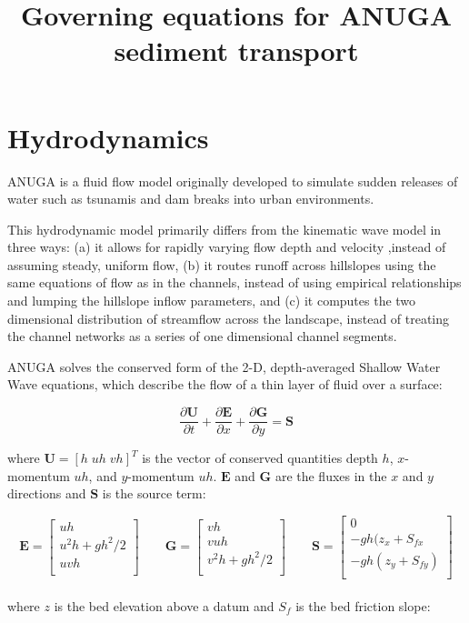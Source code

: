 \documentclass[11pt]{article}
\begin{document}
\title{Governing equations for ANUGA sediment transport}
\maketitle

\section{Hydrodynamics}

ANUGA is a fluid flow model originally developed to simulate sudden releases of water such as tsunamis and dam breaks into urban environments.

This hydrodynamic model primarily differs from the kinematic wave model in three ways: (a) it allows for rapidly varying flow depth and velocity ,instead of assuming steady, uniform flow, (b) it routes runoff across hillslopes using the same equations of flow as in the channels, instead of using empirical relationships and lumping the hillslope inflow parameters, and (c) it computes the two dimensional distribution of streamflow across the landscape, instead of treating the channel networks as a series of one dimensional channel segments.

ANUGA solves the conserved form of the 2-D, depth-averaged Shallow Water Wave equations, which describe the flow of a thin layer of fluid over a surface:

\begin{equation}
\frac{\partial{\mathbf{U}}}{\partial{t}}+\frac{\partial{\mathbf{E}}}{\partial{x}}+\frac{\partial{\mathbf{G}}}{\partial{y}} = \mathbf{S}
\end{equation}

\noindent where $\mathbf{U} = [h\;uh\;vh]^T$ is the vector of conserved quantities depth $h$, $x$-momentum $uh$, and $y$-momentum $uh$. $\mathbf{E}$ and $\mathbf{G}$ are the fluxes in the $x$ and $y$ directions and $\mathbf{S}$ is the source term:

\begin{equation}
 \mathbf{E} = \begin{bmatrix}
       uh\\[0.5em]
       u^2h+gh^2/2\\[0.5em]
       uvh\\
     \end{bmatrix}
     \qquad
      \mathbf{G} = \begin{bmatrix}
       vh\\[0.5em]
       vuh\\[0.5em]
       v^2h+gh^2/2\\
     \end{bmatrix}
 \qquad
      \mathbf{S} = \begin{bmatrix}
       0\\[0.5em]
       -gh(z_x + S_{fx}\\[0.5em]
       -gh(z_y + S_{fy})\\
     \end{bmatrix}
\end{equation}
\ \\
\noindent where $z$ is the bed elevation above a datum and $S_f$ is the bed friction slope:
\end{document}

